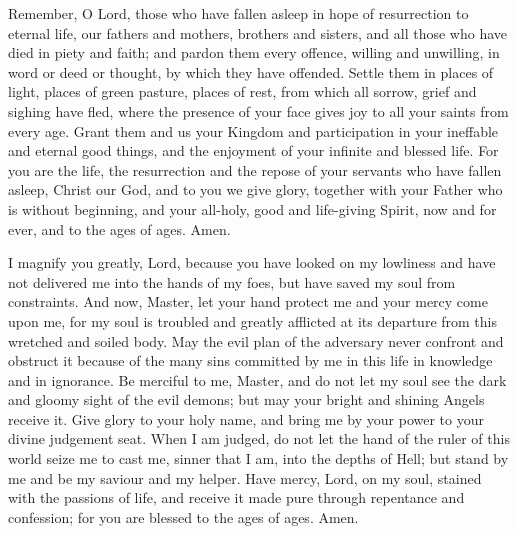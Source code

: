 

Remember, O Lord, those who have fallen asleep in hope of resurrection to eternal life, our fathers and mothers, brothers and sisters, and all those who have died in piety and faith; and pardon them every offence, willing and unwilling, in word or deed or thought, by which they have offended. Settle them in places of light, places of green pasture, places of rest, from which all sorrow, grief and sighing have fled, where the presence of your face gives joy to all your saints from every age. Grant them and us your Kingdom and participation in your ineffable and eternal good things, and the enjoyment of your infinite and blessed life. For you are the life, the resurrection and the repose of your servants who have fallen asleep, Christ our God, and to you we give glory, together with your Father who is without beginning, and your all-holy, good and life-giving Spirit, now and for ever, and to the ages of ages. Amen.



I magnify you greatly, Lord, because you have looked on my lowliness and have not delivered me into the hands of my foes, but have saved my soul from constraints. And now, Master, let your hand protect me and your mercy come upon me, for my soul is troubled and greatly afflicted at its departure from this wretched and soiled body. May the evil plan of the adversary never confront and obstruct it because of the many sins committed by me in this life in knowledge and in ignorance. Be merciful to me, Master, and do not let my soul see the dark and gloomy sight of the evil demons; but may your bright and shining Angels receive it. Give glory to your holy name, and bring me by your power to your divine judgement seat. When I am judged, do not let the hand of the ruler of this world seize me to cast me, sinner that I am, into the depths of Hell; but stand by me and be my saviour and my helper. Have mercy, Lord, on my soul, stained with the passions of life, and receive it made pure through repentance and confession; for you are blessed to the ages of ages. Amen.


\itistrulyright

\greaterinhonour


